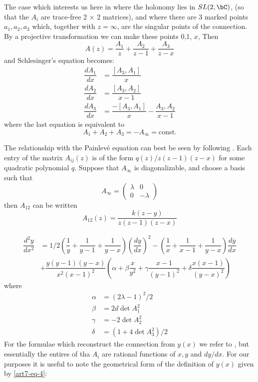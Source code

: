 The case which interests us here in where the holonomy lies in $SL(2,\bC)$, (so that the $A_{i}$ are trace-free 2 $\times$ 2 matrices), and where there are 3 marked points $a_{1}, a_{2}, a_{3}$ which, together with $z=\infty$, are the singular points of the connection. By a projective transformation we can make these points 0,1, $x$, Then
$$
A(z)= \dfrac{A_{1}}{z} + \dfrac{A_{2}}{z-1} + \dfrac{A_{3}}{z-x}
$$
and Schlesinger's equation becomes:
\begin{align}\label{art7-eq-3}
\dfrac{dA_{1}}{dx} &= \dfrac{[A_{3}, A_{1}]}{x}\nonumber\\
\dfrac{dA_{2}}{dx} &= \dfrac{[A_{3}, A_{2}]}{x-1}\\
\dfrac{dA_{3}}{dx} &= \dfrac{-[A_{3}, A_{1}]}{x} - \dfrac{A_{3}, A_{2}}{x-1}\nonumber
\end{align}
where the last equation is equivalent to
$$
A_{1} + A_{2} +A_{3} = -A_{\infty} = \text{const}.
$$

The relationship with the Painlev\'e equation can best be seen by following \cite{art7-key8}. Each entry of the matrix $A_{ij}(z)$ is of the form $q(z)/z(z-1)(z-x)$ for some quadratic polynomial $q$. Suppose that $A_{\infty}$ is diagonalizable, and choose a basis such that
$$
A_{\infty} =
\left(\begin{matrix}
\lambda & 0 \\
0 & -\lambda 
\end{matrix}\right)
$$
then $A_{12}$ can be written
\begin{equation}\label{art7-eq-4}
A_{12}(z) = \dfrac{k(z-y)}{z(z-1)(z-x)}
\end{equation}

\begin{align}\label{art7-eq-5}
 \dfrac{d^{2}y}{dx^{2}} &= 1/2\left(\dfrac{1}{y} + \dfrac{1}{y-1} + \dfrac{1}{y-x} \right)\left(\dfrac{dy}{dx}\right)^{2}
 -\left( \dfrac{1}{x} + \dfrac{1}{x-1} + \dfrac{1}{y-x}\right)\dfrac{dy}{dx}\nonumber\\
 & +\dfrac{y(y-1)(y-x)}{x^{2}(x-1)^{2}} \left(\alpha + \beta\dfrac{x}{y^{2}} + \gamma\dfrac{x-1}{(y-1)^{2}} + \delta\dfrac{x(x-1)}{(y-x)^{2}} \right)
\end{align}
where
\begin{align}\label{art7-eq-6}
\alpha &= (2\lambda -1)^{2}/2\nonumber\\
\beta &= 2d\det A_{1}^{2}\nonumber\\
\gamma &= -2\det A_{2}^{2}\nonumber\\
\delta &= (1 + 4\det A_{3}^{2})/2
\end{align} 
For the formulae which reconstruct the connection from $y(x)$ we refer to \cite{art7-key8}, but essentially the entires of tha $A_{i}$ are rational functions of $x, y$ and $dy/dx$. For our purposes it is useful to  note the geometrical form of the definition of $y(x)$ given by \ref{art7-eq-4}:

